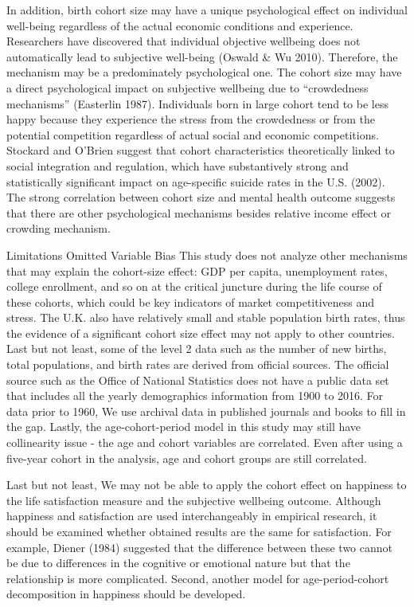 In addition, birth cohort size may have a unique psychological effect on individual well-being regardless of the actual economic conditions and experience. Researchers have discovered that individual objective wellbeing does not automatically lead to subjective well-being (Oswald & Wu 2010). Therefore, the mechanism may be a predominately psychological one. The cohort size may have a direct psychological impact on subjective wellbeing due to “crowdedness mechanisms” (Easterlin 1987). Individuals born in large cohort tend to be less happy because they experience the stress from the crowdedness or from the potential competition regardless of actual social and economic competitions. Stockard and O’Brien suggest that cohort characteristics theoretically linked to social integration and regulation, which have substantively strong and statistically significant impact on age-specific suicide rates in the U.S. (2002). The strong correlation between cohort size and mental health outcome suggests that there are other psychological mechanisms besides relative income effect or crowding mechanism.

Limitations
Omitted Variable Bias
This study does not analyze other mechanisms that may explain the cohort-size effect: GDP per capita, unemployment rates, college enrollment, and so on at the critical juncture during the life course of these cohorts, which could be key indicators of market competitiveness and stress. The U.K. also have relatively small and stable population birth rates, thus the evidence of a significant cohort size effect may not apply to other countries. Last but not least, some of the level 2 data such as the number of new births, total populations, and birth rates are derived from official sources. The official source such as the Office of National Statistics does not have a public data set that includes all the yearly demographics information from 1900 to 2016. For data prior to 1960, We use archival data in published journals and books to fill in the gap. Lastly, the age-cohort-period model in this study may still have collinearity issue - the age and cohort variables are correlated. Even after using a five-year cohort in the analysis, age and cohort groups are still correlated.

Last but not least, We may not be able to apply the cohort effect on happiness to the life satisfaction measure and the subjective wellbeing outcome. Although happiness and satisfaction are used interchangeably in empirical research, it should be examined whether obtained results are the same for satisfaction. For example, Diener (1984) suggested that the difference between these two cannot be due to differences in the cognitive or emotional nature but that the relationship is more complicated. Second, another model for age-period-cohort decomposition in happiness should be developed.

